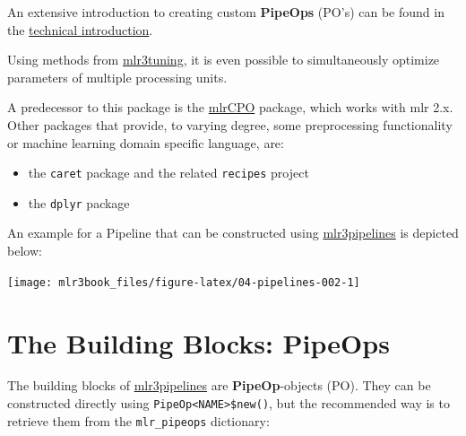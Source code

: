 \documentclass[
  11pt,
  parskip=half,
  DIV=calc,
  BCOR=10mm,
  x11names]{scrbook}
\providecommand{\tightlist}{%
  \setlength{\itemsep}{0pt}\setlength{\parskip}{0pt}}
\begin{document}
An extensive introduction to creating custom \textbf{PipeOps} (PO's) can be found in the \protect\hyperlink{extending-mlr3pipelines}{technical introduction}.

Using methods from \href{https://mlr3tuning.mlr-org.com}{mlr3tuning}, it is even possible to simultaneously optimize parameters of multiple processing units.

A predecessor to this package is the \href{https://github.com/mlr-org/mlrCPO}{mlrCPO} package, which works with mlr 2.x.
Other packages that provide, to varying degree, some preprocessing functionality or machine learning domain specific language, are:

\begin{itemize}
\tightlist
\item
  the \texttt{caret} package and the related \texttt{recipes} project
\item
  the \texttt{dplyr} package
\end{itemize}

An example for a Pipeline that can be constructed using \href{https://mlr3pipelines.mlr-org.com}{mlr3pipelines} is depicted below:

\begin{center}\texttt{[image: mlr3book\_files/figure-latex/04-pipelines-002-1]} \end{center}

\hypertarget{the-building-blocks-pipeops}{%
\section{The Building Blocks: PipeOps}\label{the-building-blocks-pipeops}}

The building blocks of \href{https://mlr3pipelines.mlr-org.com}{mlr3pipelines} are \textbf{PipeOp}-objects (PO).
They can be constructed directly using \texttt{PipeOp\textless{}NAME\textgreater{}\$new()}, but the recommended way is to retrieve them from the \texttt{mlr\_pipeops} dictionary:
\end{document}
